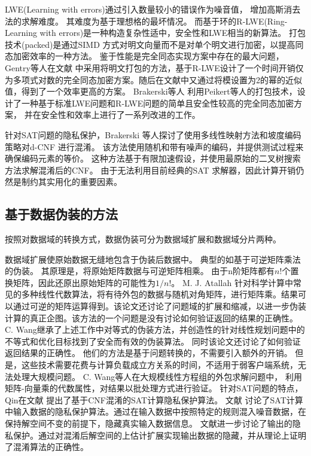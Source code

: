 LWE(Learning with errors)通过引入数量较小的错误作为噪音值，
增加高斯消去法的求解难度。
其难度为基于理想格的最坏情况。
而基于环的R-LWE(Ring-Learning with errors)是一种构造复杂性适中，安全性和LWE相当的新算法。
打包技术(packed)是通过SIMD 方式对明文向量而不是对单个明文进行加密，以提高同态加密效率的一种方法。
鉴于性能是完全同态实现方案中存在的最大问题，
Gentry等人在文献 中采用将明文打包的方法，基于R-LWE设计了一个时间开销仅为多项式对数的完全同态加密方案。随后在文献中又通过将模设置为2的幂的近似值，得到了一个效率更高的方案。
Brakerski等人
利用Peikert等人的打包技术，设计了一种基于标准LWE问题和R-LWE问题的简单且安全性较高的完全同态加密方案，
并在安全性和效率上进行了一系列改进的工作。

针对SAT问题的隐私保护，Brakerski 等人探讨了使用多线性映射方法和坡度编码策略对d-CNF 进行混淆。
该方法使用随机和带有噪声的编码，并提供测试过程来确保编码元素的等价。
这种方法基于有限加速假设，并使用最原始的二叉树搜索方法求解混淆后的CNF。
由于无法利用目前经典的SAT 求解器，因此计算开销仍然是制约其实用化的重要因素。

\subsection{基于数据伪装的方法}
按照对数据域的转换方式，数据伪装可分为数据域扩展和数据域分片两种。

数据域扩展使原始数据无缝地包含于伪装后数据中。
典型的如基于可逆矩阵乘法的伪装。
其原理是，将原始矩阵数据与可逆矩阵相乘。
由于n阶矩阵都有$n!$个置换矩阵，因此还原出原始矩阵的可能性为$1/n!$。
M. J. Atallah 针对科学计算中常见的多种线性代数算法，将有待外包的数据与随机对角矩阵，进行矩阵乘。结果可以通过可逆的矩阵运算得到。该论文还讨论了问题域的扩展和缩减，以进一步伪装计算的真正企图。该方法的一个问题是没有讨论如何验证返回的结果的正确性。
C. Wang继承了上述工作中对等式的伪装方法，并创造性的针对线性规划问题中的不等式和优化目标找到了安全而有效的伪装算法。
同时该论文还讨论了如何验证返回结果的正确性。
他们的方法是基于问题转换的，不需要引入额外的开销。
但是，这些技术需要花费与计算负载成立方关系的时间，不适用于弱客户端系统，无法处理大规模问题。
C. Wang等人在大规模线性方程组的外包求解问题中，
利用矩阵-向量乘的代数属性，对结果以批处理方式进行验证。
针对SAT问题的特点，Qin在文献 提出了基于CNF混淆的SAT计算隐私保护算法。
文献 讨论了SAT计算中输入数据的隐私保护算法。通过在输入数据中按照特定的规则混入噪音数据，在保持解空间不变的前提下，隐藏真实输入数据信息。
文献进一步讨论了输出的隐私保护。通过对混淆后解空间的上估计扩展实现输出数据的隐藏，并从理论上证明了混淆算法的正确性。

